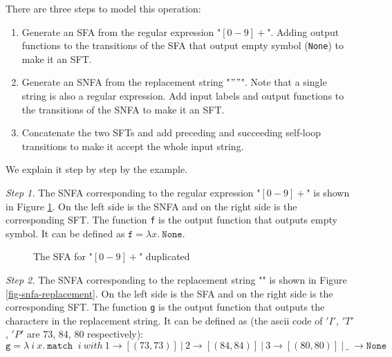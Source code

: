 \documentclass[a4paper,UKenglish,cleveref, autoref, thm-restate]{lipics-v2021}
\begin{document}
There are three steps to model this operation:

\begin{enumerate}
  \item Generate an SFA from the regular expression "$[0-9]+$". Adding output functions to the transitions of the SFA that output empty symbol (\texttt{None}) to make it an SFT.
  \item Generate an SNFA from the replacement string "$"$$"$". Note that a single string is also a regular expression. Add input labels and output functions to the transitions of the SNFA to make it an SFT.
  \item Concatenate the two SFTs and add preceding and succeeding self-loop transitions to make it accept the whole input string.
\end{enumerate}

We explain it step by step by the example.

\noindent\emph{Step 1.}
The SNFA corresponding to the regular expression "$[0-9]+$" is shown in Figure \ref{fig-snfa-pattern}. On the left side is the SNFA and on the right side is the corresponding SFT. The function \texttt{f} is the output function that outputs empty symbol. It can be defined as $\texttt{f} = \lambda x.~\texttt{None}$. 





\begin{figure}[h] \centering
{}
\caption{The SFA for "$[0-9]+$" duplicated}
\label{fig-snfa-pattern}
\end{figure}

\noindent\emph{Step 2.}
The SNFA corresponding to the replacement string "" is shown in Figure \ref{fig-snfa-replacement}. On the left side is the SFA and on the right side is the corresponding SFT. The function \texttt{g} is the output function that outputs the characters in the replacement string. It can be defined as (the ascii code of $'I'$, $'T'$, $'P'$ are 73, 84, 80 respectively):
\[
\texttt{g} = \lambda~i~x.~\texttt{match }~i~ with~ 1 \rightarrow [(73, 73)] ~|~ 2 \rightarrow [(84, 84)] ~|~ 3 \rightarrow [(80, 80)] ~|~ \_ ~\rightarrow \texttt{None}
\]
\end{document}
